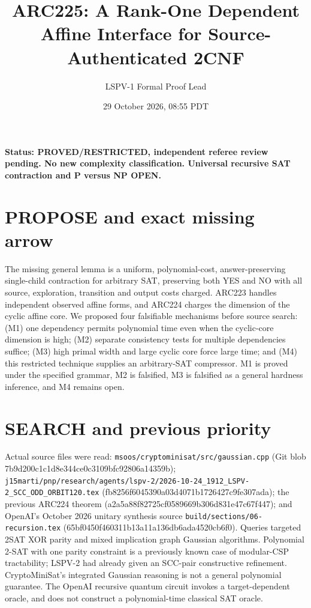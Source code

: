 \documentclass[11pt]{article}
\title{ARC225: A Rank-One Dependent Affine Interface for Source-Authenticated 2CNF}
\author{LSPV-1 Formal Proof Lead}
\date{29 October 2026, 08:55 PDT}
\begin{document}
\maketitle
\begin{center}\textbf{Status: PROVED/RESTRICTED, independent referee review pending.
No new complexity classification. Universal recursive SAT contraction and P versus NP OPEN.}\end{center}
\section{PROPOSE and exact missing arrow}
The missing general lemma is a uniform, polynomial-cost, answer-preserving single-child contraction for arbitrary SAT, preserving both YES and NO with all source, exploration, transition and output costs charged. ARC223 handles independent observed affine forms, and ARC224 charges the dimension of the cyclic affine core. We proposed four falsifiable mechanisms before source search: (M1) one dependency permits polynomial time even when the cyclic-core dimension is high; (M2) separate consistency tests for multiple dependencies suffice; (M3) high primal width and large cyclic core force large time; and (M4) this restricted technique supplies an arbitrary-SAT compressor. M1 is proved under the specified grammar, M2 is falsified, M3 is falsified as a general hardness inference, and M4 remains open.
\section{SEARCH and previous priority}
Actual source files were read: \texttt{msoos/cryptominisat/src/gaussian.cpp} (Git blob 7b9d200c1c1d8e344ce0c3109bfc92806a14359b); \texttt{j15marti/pnp/research/agents/lspv-2/2026-10-24\_1912\_LSPV-2\_SCC\_ODD\_ORBIT120.tex} (fb8256f6045390a03d4071b1726427c9fe307ada); the previous ARC224 theorem (a2a5a88f82725cf0589669b306d831e47c67f447); and OpenAI's October 2026 unitary synthesis source \texttt{build/sections/06-recursion.tex} (65bf0450f460311b13a11a136db6ada4520cb6f0). Queries targeted 2SAT XOR parity and mixed implication graph Gaussian algorithms. Polynomial 2-SAT with one parity constraint is a previously known case of modular-CSP tractability; LSPV-2 had already given an SCC-pair constructive refinement. CryptoMiniSat's integrated Gaussian reasoning is not a general polynomial guarantee. The OpenAI recursive quantum circuit invokes a target-dependent oracle, and does not construct a polynomial-time classical SAT oracle.
\end{document}
